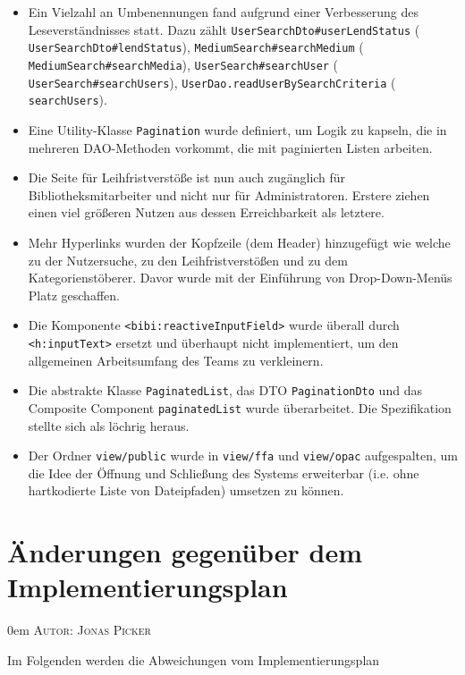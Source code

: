 \documentclass{article}
\makeatletter
\newcommand{\sectionauthor}[1]{
	{\parindent 0em \large \scshape Autor: #1 \par \nobreak \vspace*{1em}}
	\@afterheading
}
\makeatother
\begin{document}
\begin{itemize}
    \item Ein Vielzahl an Umbenennungen fand aufgrund einer Verbesserung des Leseverständnisses statt. Dazu zählt \texttt{UserSearchDto\#userLendStatus} (\textrightarrow{} \texttt{UserSearchDto\#lendStatus}), \texttt{MediumSearch\#searchMedium} (\textrightarrow{} \texttt{MediumSearch\#searchMedia}), \texttt{UserSearch\#searchUser} (\textrightarrow{} \texttt{UserSearch\#searchUsers}), \texttt{UserDao.readUserBySearchCriteria} (\textrightarrow{} \texttt{searchUsers}).
    \item Eine Utility-Klasse \texttt{Pagination} wurde definiert, um Logik zu kapseln, die in mehreren DAO-Methoden vorkommt, die mit paginierten Listen arbeiten.
    \item Die Seite für Leihfristverstöße ist nun auch zugänglich für Bibliotheksmitarbeiter und nicht nur für Administratoren. Erstere ziehen einen viel größeren Nutzen aus dessen Erreichbarkeit als letztere.
    \item Mehr Hyperlinks wurden der Kopfzeile (dem Header) hinzugefügt wie welche zu der Nutzersuche, zu den Leihfristverstößen und zu dem Kategorienstöberer. Davor wurde mit der Einführung von Drop-Down-Menüs Platz geschaffen.
    \item Die Komponente \texttt{<bibi:reactiveInputField>} wurde überall durch \texttt{<h:inputText>} ersetzt und überhaupt nicht implementiert, um den allgemeinen Arbeitsumfang des Teams zu verkleinern.
    \item Die abstrakte Klasse \texttt{PaginatedList}, das DTO \texttt{PaginationDto} und das Composite Component \texttt{paginatedList} wurde überarbeitet. Die Spezifikation stellte sich als löchrig heraus.
    \item Der Ordner \texttt{view/public} wurde in \texttt{view/ffa} und \texttt{view/opac} aufgespalten, um die Idee der Öffnung und Schließung des Systems erweiterbar (i.e. ohne hartkodierte Liste von Dateipfaden) umsetzen zu können.
\end{itemize}

\section{Änderungen gegenüber dem Implementierungsplan}
\sectionauthor{Jonas Picker}
Im Folgenden werden die Abweichungen vom Implementierungsplan
\end{document}
